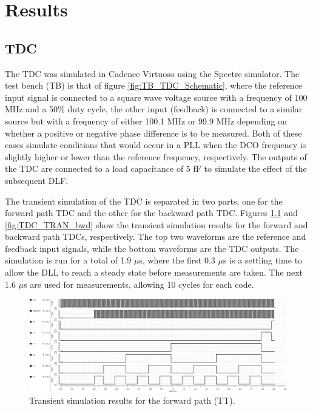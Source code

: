 \chapter{Results}

\section{TDC}
The TDC was simulated in Cadence Virtuoso using the Spectre simulator. The test bench (TB) is that of figure \ref{fig:TB_TDC_Schematic}, where the reference input signal is connected
to a square wave voltage source with a frequency of 100 MHz and a 50\% duty cycle, the other input (feedback) is connected to a similar source but with a frequency of either 100.1 MHz
or 99.9 MHz depending on whether a positive or negative phase difference is to be measured. Both of these cases simulate conditions that would occur in a PLL when the DCO frequency is
slightly higher or lower than the reference frequency, respectively. The outputs of the TDC are connected to a load capacitance of 5 fF to simulate the effect of the subsequent DLF.


The transient simulation of the TDC is separated in two parts, one for the forward path TDC and the other for the backward path TDC. Figures \ref{fig:TDC_TRAN_fwd} and \ref{fig:TDC_TRAN_bwd} show
the transient simulation results for the forward and backward path TDCs, respectively. The top two waveforms are the reference and feedback input signals, while the bottom waveforms are the TDC outputs.
The simulation is run for a total of 1.9 $\mu$s, where the first 0.3 $\mu$s is a settling time to allow the DLL to reach a steady state before measurements are taken. The next 1.6 $\mu$s are used for measurements,
allowing 10 cycles for each code.

\begin{figure}[H]
    \centering
    \includegraphics[width=1\textwidth]{figures/TDC_TRAN_fwd.png}
    \caption{Transient simulation results for the forward path (TT).}
    \label{fig:TDC_TRAN_fwd}
\end{figure}

